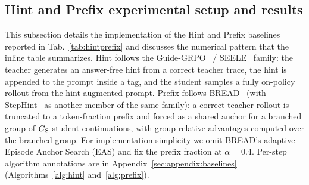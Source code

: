 \subsection{Hint and Prefix experimental setup and results}
\label{sec:appendix:hintprefix}

This subsection details the implementation of the Hint and Prefix baselines reported in Tab.~\ref{tab:hintprefix} and discusses the numerical pattern that the inline table summarizes. Hint follows the Guide-GRPO~\citep{nath2025adaptive} / SEELE~\citep{li2025staying} family: the teacher generates an answer-free hint from a correct teacher trace, the hint is appended to the prompt inside a tag, and the student samples a fully on-policy rollout from the hint-augmented prompt. Prefix follows BREAD~\citep{zhang2025bread} (with StepHint~\citep{zhang2025stephint} as another member of the same family): a correct teacher rollout is truncated to a token-fraction prefix and forced as a shared anchor for a branched group of $G_{\rm S}$ student continuations, with group-relative advantages computed over the branched group. For implementation simplicity we omit BREAD's adaptive Episode Anchor Search (EAS) and fix the prefix fraction at $\alpha\!=\!0.4$. Per-step algorithm annotations are in Appendix~\ref{sec:appendix:baselines} (Algorithms~\ref{alg:hint} and~\ref{alg:prefix}).

